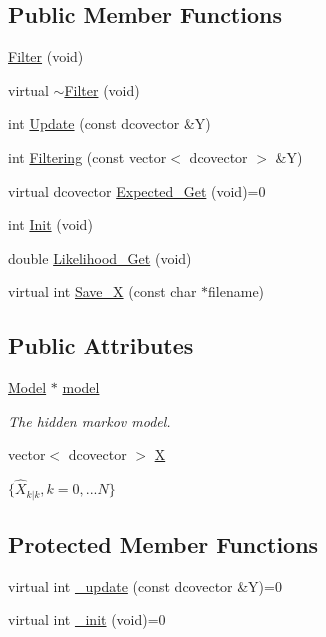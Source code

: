 \subsection*{Public Member Functions}
\begin{CompactItemize}
\item 
\hyperlink{class_filter_b86c90163e27f662edd126f5ae0d0334}{Filter} (void)
\item 
virtual \hyperlink{class_filter_f8a7766f99dd11bc8d02033e7be95c38}{$\sim$Filter} (void)
\item 
int \hyperlink{class_filter_75ba779211698e81a2334a568dcba76e}{Update} (const dcovector \&Y)
\item 
int \hyperlink{class_filter_d7944eca3250087246371a2f77e50f87}{Filtering} (const vector$<$ dcovector $>$ \&Y)
\item 
virtual dcovector \hyperlink{class_filter_f6e41ec8ada47571291b31a259858cdc}{Expected\_\-Get} (void)=0
\item 
int \hyperlink{class_filter_fbfb19e91e31f29cdcef04b9fa48c466}{Init} (void)
\item 
double \hyperlink{class_filter_0dd24e89e97c71dd06766483734c1f2a}{Likelihood\_\-Get} (void)
\item 
virtual int \hyperlink{class_filter_0b7aad4b130b176f423b7f1c0c30a887}{Save\_\-X} (const char $\ast$filename)
\end{CompactItemize}
\subsection*{Public Attributes}
\begin{CompactItemize}
\item 
\hyperlink{class_model}{Model} $\ast$ \hyperlink{class_filter_2173d25727b871e9b9d0b6f588ba3cd2}{model}
\begin{CompactList}\small\item\em The hidden markov model. \item\end{CompactList}\item 
vector$<$ dcovector $>$ \hyperlink{class_filter_fc564c7effa729f11710d78ae0111ec1}{X}
\begin{CompactList}\small\item\em $ \{ \hat{X}_{k|k} ,k=0,...N \} $ \item\end{CompactList}\end{CompactItemize}
\subsection*{Protected Member Functions}
\begin{CompactItemize}
\item 
virtual int \hyperlink{class_filter_20ecd17fed3b8f11a76c960fe5e7144b}{\_\-update} (const dcovector \&Y)=0
\item 
virtual int \hyperlink{class_filter_f46a456184971270ca36733d937f14fb}{\_\-init} (void)=0
\end{CompactItemize}
